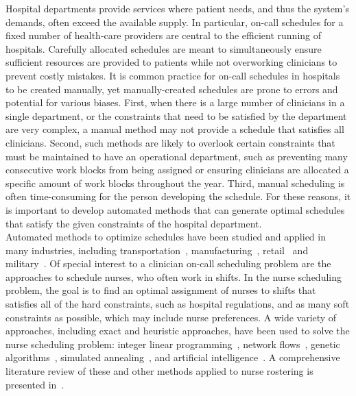 Hospital departments provide services where patient needs, and thus the system's
demands, often exceed the available supply. In particular, on-call schedules for
a fixed number of health-care providers are central to the efficient running of
hospitals. Carefully allocated schedules are meant to simultaneously ensure
sufficient resources are provided to patients while not overworking clinicians
to prevent costly mistakes. It is common practice for on-call schedules in
hospitals to be created manually, yet manually-created schedules are prone to
errors and potential for various biases. First, when there is a large number of
clinicians in a single department, or the constraints that need to be satisfied
by the department are very complex, a manual method may not provide a schedule
that satisfies all clinicians. Second, such methods are likely to overlook
certain constraints that must be maintained to have an operational department,
such as preventing many consecutive work blocks from being assigned or ensuring
clinicians are allocated a specific amount of work blocks throughout the year.
Third, manual scheduling is often time-consuming for the person developing the
schedule. For these reasons, it is important to develop automated methods that
can generate optimal schedules that satisfy the given constraints of the
hospital department. \\

Automated methods to optimize schedules have been studied and applied in many
industries, including transportation~\cite{aickelin_improved_2006,
	goel_truck_2012, gunther_combined_2010}, manufacturing~\cite{al-yakoob_mixed-integer_2007, al-yakoob_column_2008,
	alfares_simulation_2007}, retail~\cite{chapados_retail_2011,
	nissen_automatic_2010} and military~\cite{horn_scheduling_2007,
	laguna_modeling_2005}. Of special interest to a clinician on-call scheduling
problem are the approaches to schedule nurses, who often work in shifts. In the
nurse scheduling problem, the goal is to find an optimal assignment of nurses to
shifts that satisfies all of the hard constraints, such as hospital regulations,
and as many soft constraints as possible, which may include nurse preferences. A
wide variety of approaches, including exact and heuristic approaches, have been
used to solve the nurse scheduling problem: integer linear programming~\cite{azaiez_0-1_2005, trilling_nurse_2006, widyastiti_nurses_2016}, network
flows~\cite{el_adoly_new_2018}, genetic algorithms~\cite{aickelin_exploiting_2000, jan_evolutionary_2000, kawanaka_genetic_2001},
simulated annealing~\cite{jaszkiewicz_metaheuristic_1997}, and artificial
intelligence~\cite{abdennadher_nurse_nodate, li_hybrid_2003}. A comprehensive
literature review of these and other methods applied to nurse rostering is
presented in~\cite{burke_state_2004}. \\

